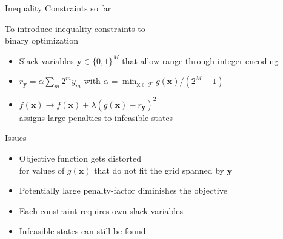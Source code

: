 \documentclass[aspectratio=169]{beamer}
\begin{document}
\begin{frame}{Inequality Constraints so far}
    \begin{minipage}{0.5\textwidth}
        To introduce inequality constraints to\\binary optimization
        \begin{itemize}
            \item Slack variables $\mathbf{y} \in \{0, 1\}^M$ that allow range through integer
                encoding
            \item $r_\mathbf{y} = \alpha \sum_m 2^m y_m$ with $\alpha = \min_{\mathbf{x} \in
                \mathcal{F}} g(\mathbf{x})/(2^M - 1)$
            \item $f(\mathbf{x}) \rightarrow f(\mathbf{x}) + \lambda
                (g(\mathbf{x}) - r_\mathbf{y})^2$\\
                assigns large penalties to infeasible states
        \end{itemize}
    \end{minipage}%
    \begin{minipage}{0.5\textwidth}
        \begin{block}{Issues}
            \vspace{10pt}
            \begin{itemize}
                \item Objective function gets distorted\\for values of
                    $g(\mathbf{x})$ that do not fit the grid spanned by
                    $\mathbf{y}$
                \item Potentially large penalty-factor diminishes the objective
                \item Each constraint requires own slack variables
                \item Infeasible states can still be found
            \end{itemize}
        \end{block}
    \end{minipage}
\end{frame}
\end{document}
